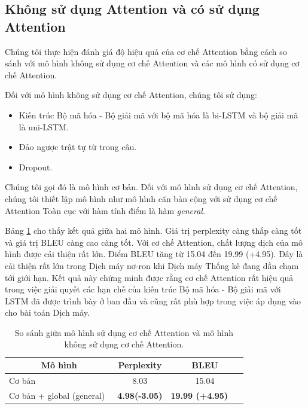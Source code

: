 \subsection{Không sử dụng Attention và có sử dụng Attention}
Chúng tôi thực hiện đánh giá độ hiệu quả của cơ chế Attention bằng cách so sánh với mô hình không sử dụng cơ chế Attention và các mô hình có sử dụng cơ chế Attention.

Đối với mô hình không sử dụng cơ chế Attention, chúng tôi sử dụng: 
\begin{itemize}
	\item Kiến trúc Bộ mã hóa - Bộ giải mã với bộ mã hóa là bi-LSTM và bộ giải mã là uni-LSTM.
	\item Đảo ngược trật tự từ trong câu.
	\item Dropout.
\end{itemize}
Chúng tôi gọi đó là mô hình cơ bản. Đối với mô hình sử dụng cơ chế Attention, chúng tôi thiết lập mô hình như mô hình căn bản cộng với sử dụng cơ chế Attention Toàn cục với hàm tính điểm là hàm \textit{general}.

Bảng \ref{tab_non-attn_vs_attn} cho thấy kết quả giữa hai mô hình. Giá trị perplexity càng thấp càng tốt và giá trị BLEU càng cao càng tốt. Với cơ chế Attention, chất lượng dịch của mô hình được cải thiện rất lớn. Điểm BLEU tăng từ 15.04 đến 19.99 (+4.95). Đây là cải thiện rất lớn trong Dịch máy nơ-ron khi Dịch máy Thống kê đang dần chạm tới giới hạn. Kết quả này chứng minh được rằng cơ chế Attention rất hiệu quả trong việc giải quyết các hạn chế của kiến trúc Bộ mã hóa - Bộ giải mã với LSTM đã được trình bày ở ban đầu và cũng rất phù hợp trong việc áp dụng vào cho bài toán Dịch máy.

\begin{table}
	\centering
	\caption{So sánh giữa mô hình sử dụng cơ chế Attention và mô hình không sử dụng cơ chế Attention.}
	\begin{tabular}{|l|c|c|} 
		\hline
		\multicolumn{1}{|c|}{ \textbf{Mô hình} } & \textbf{Perplexity}   & \textbf{BLEU}              \\ 
		\hline
		Cơ bản                                   & 8.03                  & 15.04                      \\ 
		\hline
		Cơ bản + global (general)~               & \textbf{4.98(-3.05)}  & \textbf{19.99 (+4.95)}~ ~  \\
		\hline
	\end{tabular}
	\label{tab_non-attn_vs_attn}
\end{table}

